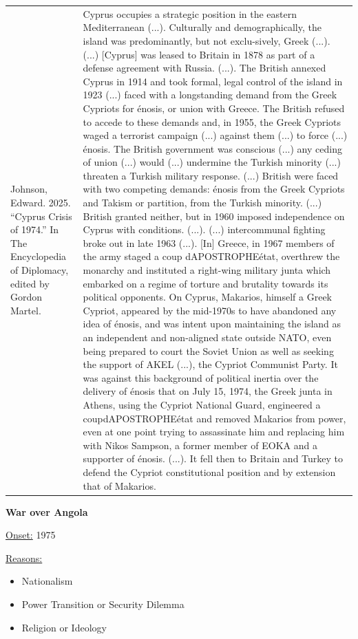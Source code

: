 {\begin{longtable}{p{}p{}}
\\
Johnson, Edward. 2025. “Cyprus Crisis of 1974.” In The Encyclopedia of Diplomacy, edited by Gordon Martel. & Cyprus occupies a strategic position in the eastern Mediterranean (...). Culturally and demographically, the island was predominantly, but not exclu-sively, Greek (...). (...) [Cyprus] was leased to Britain in 1878 as part of a defense agreement with Russia. (...). The British annexed Cyprus in 1914 and took formal, legal control of the island in 1923 (...) faced with a longstanding demand from the Greek Cypriots for énosis, or union with Greece. The British refused to accede to these demands and, in 1955, the Greek Cypriots waged a terrorist campaign (...) against them (...) to force (...) énosis. The British government was conscious (...) any ceding of union (...) would (...) undermine the Turkish minority (...) threaten a Turkish military response. (...) British were faced with two competing demands: énosis from the Greek Cypriots and Takism or partition, from the Turkish minority. (...) British granted neither, but in 1960 imposed independence on Cyprus with conditions. (...). (...) intercommunal fighting broke out in late 1963 (...). [In] Greece, in 1967 members of the army staged a coup dAPOSTROPHEétat, overthrew the monarchy and instituted a right-wing military junta which embarked on a regime of torture and brutality towards its political opponents. On Cyprus, Makarios, himself a Greek Cypriot, appeared by the mid-1970s to have abandoned any idea of énosis, and was intent upon maintaining the island as an independent and non-aligned state outside NATO, even being prepared to court the Soviet Union as well as seeking the support of AKEL (...), the Cypriot Communist Party. It was against this background of political inertia over the delivery of énosis that on July 15, 1974, the Greek junta in Athens, using the Cypriot National Guard, engineered a coupdAPOSTROPHEétat and removed Makarios from power, even at one point trying to assassinate him and replacing him with Nikos Sampson, a former member of EOKA and a supporter of énosis. (...). It fell then to Britain and Turkey to defend the Cypriot constitutional position and by extension that of Makarios.
\\
\end{longtable}}
\clearpage
         \textbf{War over Angola} 

          \underline{Onset:} 1975         

\underline{Reasons:}
\begin{itemize}
\item Nationalism
\item Power Transition or Security Dilemma
\item Religion or Ideology
\end{itemize}

